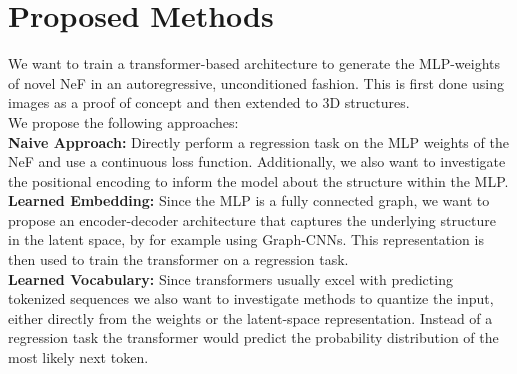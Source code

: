 \section{Proposed Methods}
\label{sec:method}
We want to train a transformer-based architecture to generate the MLP-weights of novel
NeF in an autoregressive, unconditioned fashion. This is first done using images as a
proof of concept and then extended to 3D structures.\\

\noindent We propose the following approaches:\\
\noindent \textbf{Naive Approach: }
Directly perform a regression task on the MLP weights of the NeF and use a continuous loss function.
Additionally, we also want to investigate the positional encoding to inform the model about the structure within the MLP.
\\
\textbf{Learned Embedding: }
Since the MLP is a fully connected graph, we want to propose an encoder-decoder architecture that captures the underlying structure in the latent space, by for example using Graph-CNNs. This representation is then used to train the transformer on a regression task.
\\
\textbf{Learned Vocabulary: }
Since transformers usually excel with predicting tokenized sequences we also want to investigate methods to quantize the input, either directly from the weights or the latent-space representation. Instead of a regression task the transformer would predict the probability distribution of the most likely next token.
